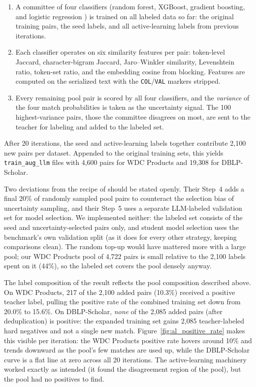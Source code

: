 \documentclass[a4paper,oneside,bibliography=totoc]{scrbook}
\begin{document}
\begin{enumerate}
\item A committee of four classifiers (random forest, XGBoost, gradient boosting, and logistic regression \cite{breiman2001random,chen2016xgboost,friedman2001greedy}) is trained on all labeled data so far: the original training pairs, the seed labels, and all active-learning labels from previous iterations.
\item Each classifier operates on six similarity features per pair: token-level Jaccard, character-bigram Jaccard, Jaro--Winkler similarity, Levenshtein ratio, token-set ratio, and the embedding cosine from blocking. Features are computed on the serialized text with the \texttt{COL}/\texttt{VAL} markers stripped.
\item Every remaining pool pair is scored by all four classifiers, and the \emph{variance} of the four match probabilities is taken as the uncertainty signal. The 100 highest-variance pairs, those the committee disagrees on most, are sent to the teacher for labeling and added to the labeled set.
\end{enumerate}

After 20 iterations, the seed and active-learning labels together contribute 2{,}100 new pairs per dataset. Appended to the original training sets, this yields \texttt{train\_aug\_llm} files with 4{,}600 pairs for WDC Products and 19{,}308 for DBLP-Scholar.

Two deviations from the recipe of \citet{steiner2026labeling} should be stated openly. Their Step~4 adds a final 20\% of randomly sampled pool pairs to counteract the selection bias of uncertainty sampling, and their Step~5 uses a separate LLM-labeled validation set for model selection. We implemented neither: the labeled set consists of the seed and uncertainty-selected pairs only, and student model selection uses the benchmark's own validation split (as it does for every other strategy, keeping comparisons clean). The random top-up would have mattered more with a large pool; our WDC Products pool of 4{,}722 pairs is small relative to the 2{,}100 labels spent on it (44\%), so the labeled set covers the pool densely anyway.

The label composition of the result reflects the pool composition described above. On WDC Products, 217 of the 2{,}100 added pairs (10.3\%) received a positive teacher label, pulling the positive rate of the combined training set down from 20.0\% to 15.6\%. On DBLP-Scholar, \emph{none} of the 2{,}085 added pairs (after deduplication) is positive: the expanded training set gains 2{,}085 teacher-labeled hard negatives and not a single new match. Figure~\ref{fig:al_positive_rate} makes this visible per iteration: the WDC Products positive rate hovers around 10\% and trends downward as the pool's few matches are used up, while the DBLP-Scholar curve is a flat line at zero across all 20 iterations. The active-learning machinery worked exactly as intended (it found the disagreement region of the pool), but the pool had no positives to find.
\end{document}
